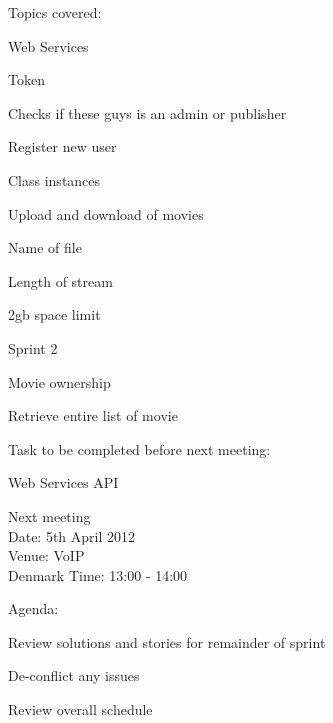 Topics covered:
\begin{my_itemize}
\item Web Services
	\begin{my_itemize}
	\item Token

		\begin{my_itemize}
		\item Checks if these guys is an admin or publisher
		\end{my_itemize}

	\item Register new user

		\begin{my_itemize}
		\item Class instances
		\end{my_itemize}

	\item Upload and download of movies

		\begin{my_itemize}
		\item Name of file

		\item Length of stream

		\item 2gb space limit
		\end{my_itemize}

	\end{my_itemize}

\item Sprint 2
	\begin {my_itemize}
	\item Movie ownership

	\item Retrieve entire list of movie

	\end{my_itemize}

\end{my_itemize}
 
Task to be completed before next meeting:
\begin{my_itemize}
\item Web Services API

\end{my_itemize}
	
Next meeting\\
Date: 5th April 2012\\
Venue: VoIP\\
Denmark Time: 13:00 - 14:00
 
Agenda:
\begin{my_itemize}
\item Review solutions and stories for remainder of sprint

\item De-conflict any issues

\item Review overall schedule

\end{my_itemize}
